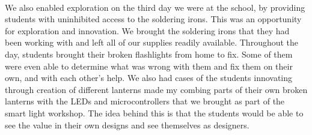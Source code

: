 \documentclass[11pt, twocolumn]{article}
\begin{document}
\ \\
We also enabled exploration on the third day we were at the school, by providing students with uninhibited access to the soldering irons. This was an opportunity for exploration and innovation. We brought the soldering irons that they had been working with and left all of our supplies readily available. Throughout the day, students brought their broken flashlights from home to fix. Some of them were even able to determine what was wrong with them and fix them on their own, and with each other’s help. We also had cases of the students innovating through creation of different lanterns made my combing parts of their own broken lanterns with the LEDs and microcontrollers that we brought as part of the smart light workshop. The idea behind this is that the students would be able to see the value in their own designs and see themselves as designers.\ \\
\ \\
\end{document}
